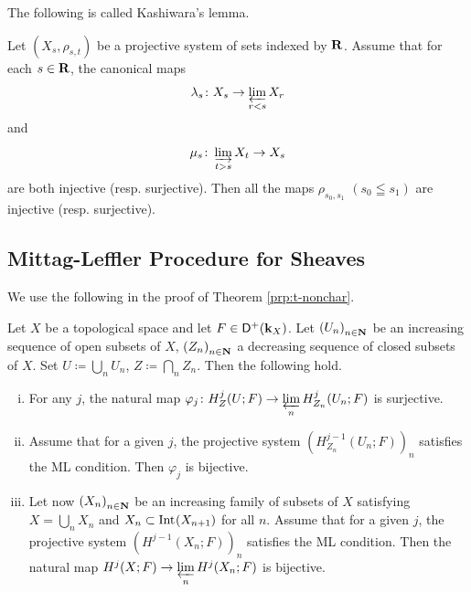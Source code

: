 The following is called Kashiwara's lemma.

\begin{Proposition+}[{\cite[Proposition 1.12.6]{KS90}}]\label{prop:ks1.12.6}
  Let \(\left(X_s,\rho_{s,t}\right)\) be 
  a projective system of sets indexed by \(\rr\). 
  Assume that for each \(s\in\rr\), the canonical maps\[
    \lambda_s\colon X_s\to\prolim[r<s]X_r
  \] and \[
    \mu_s\colon \indlim[t>s]X_t\to X_s
  \] are both injective (resp. surjective). 
  Then all the maps \(\rho_{s_{0},s_{1}}\) \((s_0\leqq s_1)\) are 
  injective (resp. surjective).
\end{Proposition+}

\subsection{Mittag-Leffler Procedure for Sheaves}

We use the following 
in the proof of Theorem \ref{prp:t-nonchar}.

\begin{Proposition+}[{\cite[Proposition 2.7.1]{KS90}}]\label{prop:ks2.7.1}
  Let \(X\) be a topological space and let \(F\in\Dompl(\kk_X)\). 
  Let \(\left(U_n\right)_{n\in\nn}\) be an increasing sequence 
  of open subsets of \(X\), \(\left(Z_n\right)_{n\in\nn}\) 
  a decreasing sequence of closed subsets of \(X\). 
  Set \(U\coloneqq\bigcup_{n}U_{n}\), 
  \(Z\coloneqq\bigcap_{n}Z_{n}\). 
  Then the following hold.
  \begin{enumerate}[(i)]
    \item \label{item:ks2.7.1.1} For any \(j\), the natural map \(
      \varphi_j\colon H^{j}_{Z}(U;F)
      \to 
      \prolim[n]H^{j}_{Z_{n}}(U_{n};F)
    \) is surjective. 
    \item \label{item:ks2.7.1.2} Assume that for a given \(j\), 
    the projective system \(
      (H^{j-1}_{Z_{n}}(U_{n};F))_{n}
    \) satisfies the ML condition. 
    Then \(\varphi_{j}\) is bijective. 
    \item \label{item:ks2.7.1.3} Let now \(\left(X_{n}\right)_{n\in\nn}\) be 
    an increasing family of subsets of \(X\) satisfying \(
      X=\bigcup_{n}X_n\) and \(X_{n}\subset \Int[](X_{n+1})
    \) for all \(n\). 
    Assume that for a given \(j\), the projective system \(
      \left(H^{j-1}(X_{n};F)\right)_{n}
    \) satisfies the ML condition. 
    Then the natural map \(
      H^{j}(X;F)\to \prolim[n]H^{j}(X_{n};F)
    \) is bijective. 
  \end{enumerate}
\end{Proposition+}


